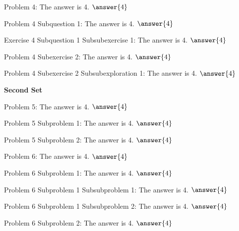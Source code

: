 \documentclass{ximera}
\begin{document}
\begin{problem}
    Problem 4: The answer is 4. $\answer{4}$
    \begin{question}
        Problem 4 Subquestion 1: The answer is 4. $\answer{4}$
        \begin{exercise}
            Exercise 4 Subquestion 1 Subsubexercise 1: The answer is 4. $\answer{4}$
        \end{exercise}
    \end{question}
    \begin{exercise}
        Problem 4 Subexercise 2: The answer is 4. $\answer{4}$
        \begin{exploration}
            Problem 4 Subexercise 2 Subsubexploration 1: The answer is 4. $\answer{4}$
        \end{exploration}
    \end{exercise}
\end{problem}

%
\numberedProblemstrue

{{\bfseries \large Second Set}}

\begin{problem}
    Problem 5: The answer is 4. $\answer{4}$
    \begin{problem}
        Problem 5 Subproblem 1: The answer is 4. $\answer{4}$
    \end{problem} 
    \begin{problem}
        Problem 5 Subproblem 2: The answer is 4. $\answer{4}$
    \end{problem} 
\end{problem} 

\begin{problem}
    Problem 6: The answer is 4. $\answer{4}$
    \begin{problem}
        Problem 6 Subproblem 1: The answer is 4. $\answer{4}$
        \begin{problem}
            Problem 6 Subproblem 1 Subsubproblem 1: The answer is 4. $\answer{4}$
        \end{problem} 
        \begin{problem}
            Problem 6 Subproblem 1 Subsubproblem 2: The answer is 4. $\answer{4}$
        \end{problem} 
    \end{problem} 
    \begin{problem}
        Problem 6 Subproblem 2: The answer is 4. $\answer{4}$
    \end{problem} 
\end{problem} 
\end{document}
